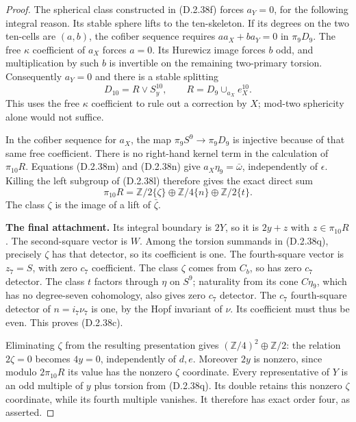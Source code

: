 \begin{proof}
The spherical class constructed in \textup{(D.2.38f)} forces
$a_Y=0$, for the following integral reason.  Its stable sphere
lifts to the ten-skeleton.  If its degrees on the two ten-cells
are $(a,b)$, the cofiber sequence requires
$a a_X+b a_Y=0$ in $\pi_9D_9$.
The free $\kappa$ coefficient of $a_X$ forces $a=0$.
Its Hurewicz image forces $b$ odd, and multiplication by such
$b$ is invertible on the remaining two-primary torsion.
Consequently $a_Y=0$ and there is a stable splitting
\[
 D_{10}=R\vee S^{10}_y,\qquad
 R=D_9\cup_{a_X}e^{10}_X.
 \tag{D.2.38p}
\]
This uses the free $\kappa$ coefficient to rule out a correction
by $X$; mod-two sphericity alone would not suffice.

In the cofiber sequence for $a_X$, the map
$\pi_9S^9\to\pi_9D_9$ is injective because of that same free
coefficient.  There is no right-hand kernel term in the
calculation of $\pi_{10}R$.
Equations \textup{(D.2.38m)} and \textup{(D.2.38n)} give
$a_X\eta_9=\bar\omega$, independently of $\epsilon$.
Killing the left subgroup of \textup{(D.2.38l)} therefore gives
the exact direct sum
\[
 \pi_{10}R=\mathbb Z/2\{\zeta\}\oplus
           \mathbb Z/4\{n\}\oplus\mathbb Z/2\{t\}.
 \tag{D.2.38q}
\]
The class $\zeta$ is the image of a lift of $\bar\zeta$.

\medskip\noindent
\textbf{The final attachment.}
Its integral boundary is $2Y$, so it is $2y+z$ with
$z\in\pi_{10}R$.
The second-square vector is $W$.  Among the torsion summands
in \textup{(D.2.38q)}, precisely $\zeta$ has that detector,
so its coefficient is one.
The fourth-square vector is $z_7=S$, with zero $c_7$ coefficient.
The class $\zeta$ comes from $C_b$, so has zero $c_7$ detector.
The class $t$ factors through $\eta$ on $S^9$; naturality from
its cone $C\eta_9$, which has no degree-seven cohomology,
also gives zero $c_7$ detector.
The $c_7$ fourth-square detector of $n=i_7\nu_7$ is one,
by the Hopf invariant of $\nu$.  Its coefficient must thus
be even.  This proves \textup{(D.2.38c)}.

Eliminating $\zeta$ from the resulting presentation gives
$(\mathbb Z/4)^2\oplus\mathbb Z/2$:
the relation $2\zeta=0$ becomes $4y=0$, independently of
$d,e$.  Moreover $2y$ is nonzero, since modulo
$2\pi_{10}R$ its value has the nonzero $\zeta$ coordinate.
Every representative of $Y$ is an odd multiple of $y$ plus
torsion from \textup{(D.2.38q)}.  Its double retains this
nonzero $\zeta$ coordinate, while its fourth multiple vanishes.
It therefore has exact order four, as asserted.


\end{proof}

